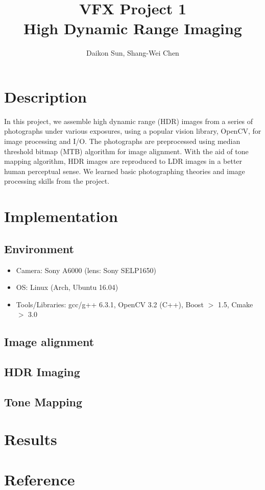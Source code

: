 \documentclass[11pt]{article}
\title{\bf{VFX Project 1\\\large{High Dynamic Range Imaging}}\vspace{-10pt}}
\author{Daikon Sun, Shang-Wei Chen}
\date{}
\begin{document}
\maketitle
\section{Description}
In this project, we assemble high dynamic range (HDR) images from a series of photographs under various exposures, using a popular vision library, OpenCV, for image processing and I/O. The photographs are preprocessed using median threshold bitmap (MTB) algorithm for image alignment. With the aid of tone mapping algorithm, HDR images are reproduced to LDR images in a better human perceptual sense. We learned basic photographing theories and image processing skills from the project. 

\section{Implementation}
\subsection{Environment}
\begin{itemize}
  \itemsep=-2pt
  \item Camera: Sony A6000 (lens: Sony SELP1650)
  \item OS: Linux (Arch, Ubuntu 16.04)
  \item Tools/Libraries: gcc/g++ 6.3.1, OpenCV 3.2 (C++), Boost $>$ 1.5, Cmake $>$ 3.0
\end{itemize}

\subsection{Image alignment}


\subsection{HDR Imaging}


\subsection{Tone Mapping}


\section{Results}

\begin{figure}[!ht]
  \centering
  \label{distort}
\end{figure}

\section{Reference}


\end{document}
